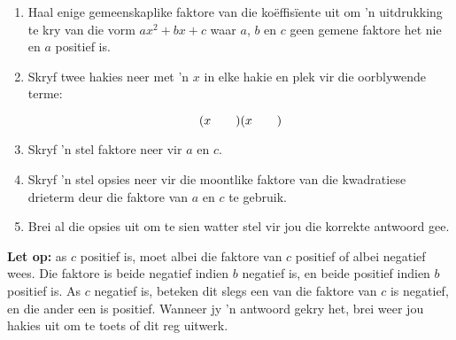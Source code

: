\begin{enumerate}[itemsep=5pt, label=\textbf{\arabic*}. ] 
\item Haal enige gemeenskaplike faktore van die koëffisïente uit om ’n uitdrukking te kry van die vorm $a{x}^{2}+bx+c$ waar $a$, $b$ en $c$ geen gemene faktore het nie en $a$ positief is.
\item Skryf twee hakies neer met ’n $x$ in elke hakie en plek vir die oorblywende terme:

\begin{equation*}
(x\phantom{\rule{2.em}{0ex}})(x\phantom{\rule{2.em}{0ex}})
\end{equation*}
\item Skryf ’n stel faktore neer vir $a$ en $c$.
\item Skryf ’n stel opsies neer vir die moontlike faktore van die kwadratiese drieterm deur die faktore van $a$ en $c$ te gebruik.
\item Brei al die opsies uit om te sien watter stel vir jou die korrekte antwoord gee.
\end{enumerate}
 \textbf{Let op:} as $c$ positief is, moet albei die faktore van $c$ positief of albei negatief wees. Die faktore is beide negatief indien $b$ negatief is, en beide positief indien $b$ positief is. As $c$ negatief is, beteken dit slegs een van die faktore van $c$ is negatief, en die ander een is positief. Wanneer jy ’n antwoord gekry het, brei weer jou hakies uit om te toets of dit reg uitwerk. 

